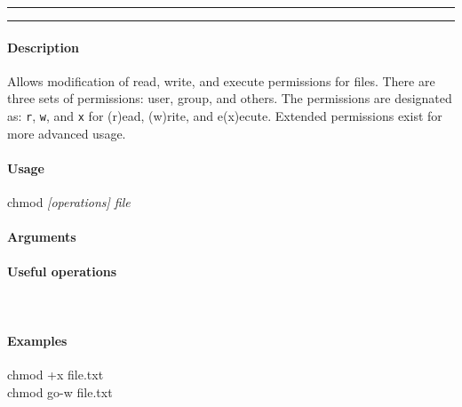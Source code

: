 \hrule
\vspace{1mm}
\hrule
\vspace{4mm}

\paragraph{Description}
\indentpar \raggedright \textrm{Allows modification of read, write, and execute permissions for files. There are three sets of permissions: user, group, and others. The permissions are designated as: \texttt{r}, \texttt{w}, and \texttt{x} for (r)ead, (w)rite, and e(x)ecute. Extended permissions exist for more advanced usage.}\\

\paragraph{Usage}
\indentpar chmod \textit{[operations] file}

\paragraph{Arguments}
\indentpar {}

\paragraph{Useful operations}
\indentpar {}\\
\indentpar {}

\paragraph{Examples}

\indentpar chmod +x file.txt\\
\indentpar chmod go-w file.txt

\vspace{20mm}